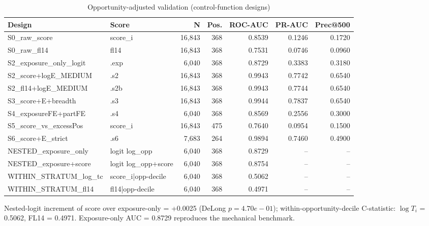 \begin{table}[htbp]\centering
\caption{Opportunity-adjusted validation (control-function designs)}
\label{tab:opp_adjusted_validation}
\begin{tabular}{llrrrrr}\hline
Design & Score & N & Pos. & ROC-AUC & PR-AUC & Prec@500 \\\hline
S0\_raw\_score & score\_i & 16,843 & 368 & 0.8539 & 0.1246 & 0.1720 \\
S0\_raw\_fl14 & fl14 & 16,843 & 368 & 0.7531 & 0.0746 & 0.0960 \\
S2\_exposure\_only\_logit & .exp &  6,040 & 368 & 0.8729 & 0.3383 & 0.3180 \\
S2\_score+logE\_MEDIUM & .s2 & 16,843 & 368 & 0.9943 & 0.7742 & 0.6540 \\
S2\_fl14+logE\_MEDIUM & .s2b & 16,843 & 368 & 0.9943 & 0.7744 & 0.6540 \\
S3\_score+E+breadth & .s3 & 16,843 & 368 & 0.9944 & 0.7837 & 0.6540 \\
S4\_exposureFE+partFE & .s4 &  6,040 & 368 & 0.8569 & 0.2556 & 0.3000 \\
S5\_score\_vs\_excessPos & score\_i & 16,843 & 475 & 0.7640 & 0.0954 & 0.1500 \\
S6\_score+E\_strict & .s6 &  7,683 & 264 & 0.9894 & 0.7460 & 0.4900 \\
NESTED\_exposure\_only & logit log\_opp &  6,040 & 368 & 0.8729 & -- & -- \\
NESTED\_exposure+score & logit log\_opp+score &  6,040 & 368 & 0.8754 & -- & -- \\
WITHIN\_STRATUM\_log\_tc & score\_i|opp-decile &  6,040 & 368 & 0.5062 & -- & -- \\
WITHIN\_STRATUM\_fl14 & fl14|opp-decile &  6,040 & 368 & 0.4971 & -- & -- \\
\hline\end{tabular}
\begin{tablenotes}\footnotesize\item Nested-logit increment of score over exposure-only = +0.0025 (DeLong $p=4.70e-01$); within-opportunity-decile C-statistic: $\log T_i$ = 0.5062, FL14 = 0.4971. Exposure-only AUC = 0.8729 reproduces the mechanical benchmark.\end{tablenotes}
\end{table}
